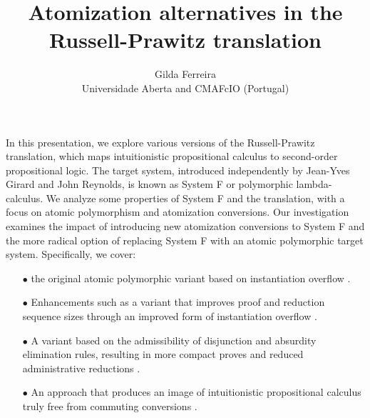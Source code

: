\documentclass[a4paper]{article} %
\date{} %
\begin{document}
\title{Atomization alternatives in the Russell-Prawitz translation}

\author{Gilda Ferreira\\ 
       {\normalsize Universidade Aberta and CMAFcIO (Portugal)} 
       }%



\maketitle

\thispagestyle{empty}


In this presentation, we explore various versions of the Russell-Prawitz translation, which maps intuitionistic propositional calculus to second-order propositional logic. The target system, introduced independently by Jean-Yves Girard and John Reynolds, is known as System F or polymorphic lambda-calculus. We analyze some properties of System F and the translation, with a focus on atomic polymorphism and atomization conversions. Our investigation examines the impact of introducing new atomization conversions to System F \cite{JoseESpiritoSanto} and the more radical option of replacing System F with an atomic polymorphic target system. Specifically, we cover:

\begin{itemize}
	\item[$\bullet$] the original atomic polymorphic variant based on instantiation overflow \cite{Ferreira06,FerreiraFerreira12}.
	\item[$\bullet$] Enhancements such as a variant that improves proof and reduction sequence sizes through an improved form of instantiation overflow \cite{PistoneTranchiniPetrolo}.
	\item[$\bullet$] A variant based on the admissibility of disjunction and absurdity elimination rules, resulting in more compact proves and reduced administrative reductions \cite{JoseESpiritoSanto2019}.
	\item[$\bullet$] An approach that produces an image of intuitionistic propositional calculus truly free from commuting conversions \cite{JoseESpiritoSanto2024}.
\end{itemize}
\end{document}
